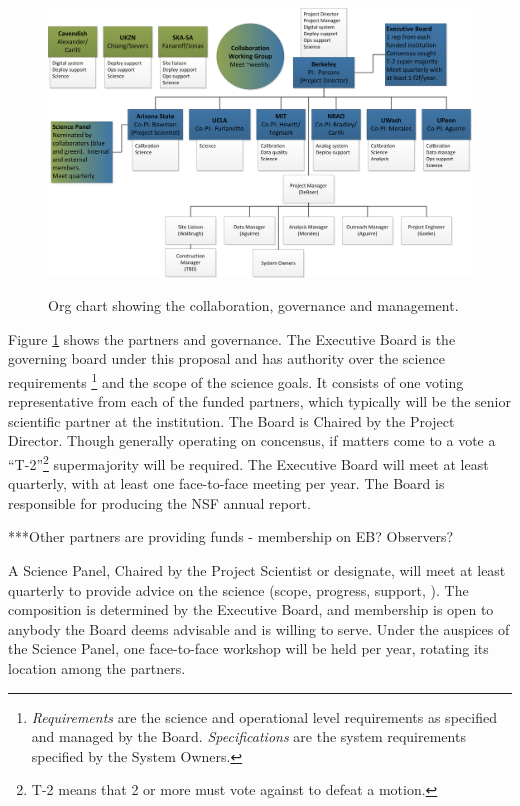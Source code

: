 \documentclass[preprint]{aastex}
\begin{document}
\begin{figure}[h]
\centering
\includegraphics[width=\textwidth]{plots/org.png}
\label{fig:org}
\caption{Org chart showing the collaboration, governance and management.}
\end{figure}

Figure \ref{fig:org} shows the partners and governance. The Executive Board is the
governing board under this proposal and has authority over the science requirements
\footnote{{\em Requirements} are the science and operational level requirements as
specified and managed by the Board.  {\em Specifications} are the system requirements
specified by the System Owners.}
and the scope of the science goals. It consists of one voting representative from
each of the funded partners, which typically will be the senior scientific partner at
the institution. The Board is Chaired by the Project Director. Though generally
operating on concensus, if matters come to a vote a ``T-2''\footnote{T-2 means that 2
or more must vote against to defeat a motion.} supermajority will be required. The
Executive Board will meet at least quarterly, with at least one face-to-face meeting
per year. The Board is responsible for producing the NSF annual report.

***Other partners are providing funds - membership on EB?  Observers?

A Science Panel, Chaired by the Project Scientist or designate, will meet at least
quarterly to provide advice on the science (scope, progress, support, ). The
composition is determined by the Executive Board, and membership is open to anybody
the Board deems advisable and is willing to serve. Under the auspices of the Science
Panel, one face-to-face workshop will be held per year, rotating its location among
the partners.
\end{document}
